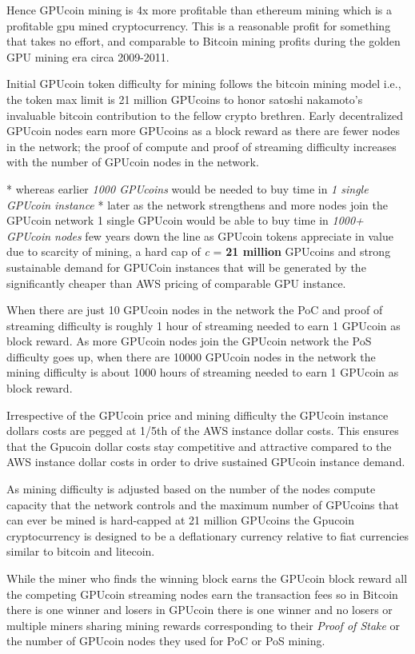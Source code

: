 Hence GPUcoin mining is 4x more profitable than ethereum mining which is a profitable gpu mined cryptocurrency. This is a reasonable profit for something that takes no effort, and comparable to Bitcoin mining profits during the golden GPU mining era circa 2009-2011.

Initial GPUcoin token difficulty for mining follows the bitcoin mining model i.e., the token max limit is 21 million GPUcoins to honor satoshi nakamoto’s invaluable bitcoin contribution to the fellow crypto brethren. Early decentralized GPUcoin nodes earn more GPUcoins as a block reward as there are fewer nodes in the network; the proof of compute and proof of streaming difficulty increases with the number of GPUcoin nodes in the network.

* whereas earlier \emph{1000 GPUcoins} would be needed to buy time in \emph{1 single GPUcoin instance}
* later as the network strengthens and more nodes join the GPUcoin network 1 single GPUcoin would be able to buy time in \emph{1000+ GPUcoin nodes} few years down the line as GPUcoin tokens appreciate in value due to scarcity of mining, a hard cap of \emph{c} = \textbf{21 million} GPUcoins and strong sustainable demand for GPUCoin instances that will be generated by the significantly cheaper than AWS pricing of comparable GPU instance.

When there are just 10 GPUcoin nodes in the network the PoC and proof of streaming difficulty is roughly 1 hour of streaming needed to earn 1 GPUcoin as block reward. As more GPUcoin nodes join the GPUcoin network the PoS difficulty goes up, when there are 10000 GPUcoin nodes in the network the mining difficulty is about 1000 hours of streaming needed to earn 1 GPUcoin as block reward.

Irrespective of the GPUcoin price and mining difficulty the GPUcoin instance dollars costs are pegged at 1/5th of the AWS instance dollar costs. This ensures that the Gpucoin dollar costs stay competitive and attractive compared to the AWS instance dollar costs in order to drive sustained GPUcoin instance demand.

As mining difficulty is adjusted based on the number of the nodes compute capacity that the network controls and the maximum number of GPUcoins that can ever be mined is hard-capped at 21 million GPUcoins the Gpucoin cryptocurrency is designed to be a deflationary currency relative to fiat currencies similar to bitcoin and litecoin.

While the miner who finds the winning block earns the GPUcoin block reward all the competing GPUcoin streaming nodes earn the transaction fees so in Bitcoin there is one winner and losers in GPUcoin there is one winner and no losers or multiple miners sharing mining rewards corresponding to their \emph{Proof of Stake} or the number of GPUcoin nodes they used for PoC or PoS mining.
